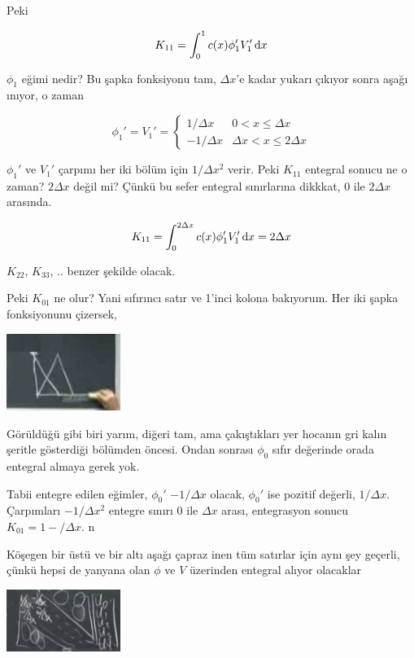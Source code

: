 \documentclass[12pt,fleqn]{article}\usepackage{../../common}
\begin{document}
Peki

$$
K_{11} = \int _{0}^{1} c(x) \phi_1' V_1' \,\mathrm{d} x
$$

$\phi_1$ eğimi nedir? Bu şapka fonksiyonu tam, $\Delta x$'e kadar yukarı
çıkıyor sonra aşağı ınıyor, o zaman

$$
\phi_1' = V_1' =
\left\{ \begin{array}{rc}
1/\Delta x & 0 < x \le \Delta x \\
-1/\Delta x & \Delta x < x \le 2\Delta x 
\end{array} \right.
$$

$\phi_1'$ ve $V_1'$ çarpımı her iki bölüm için $1/\Delta x^2$ verir. Peki
$K_{11}$ entegral sonucu ne o zaman? $2 \Delta x$ değil mi? Çünkü bu sefer
entegral sınırlarına dikkkat, 0 ile $2\Delta x$ arasında. 

$$
K_{11} = \int _{0}^{2\Delta x} c(x) \phi_1' V_1' \,\mathrm{d} x = 2\Delta x
$$

$K_{22}$, $K_{33}$, .. benzer şekilde olacak. 

Peki $K_{01}$ ne olur? Yani sıfırıncı satır ve 1'inci kolona bakıyorum. Her iki
şapka fonksiyonunu çizersek,

\includegraphics[width=10em]{compscieng_1_18_07.png}

Görüldüğü gibi biri yarım, diğeri tam, ama çakıştıkları yer hocanın gri
kalın şeritle gösterdiği bölümden öncesi. Ondan sonrası $\phi_0$ sıfır
değerinde orada entegral almaya gerek yok. 

Tabii entegre edilen eğimler, $\phi_0'$ $-1/\Delta x$ olacak, $\phi_0'$ ise
pozitif değerli, $1/\Delta x$. Çarpımları $-1/\Delta x^2$ entegre sınırı 0 ile
$\Delta x$ arası, entegrasyon sonucu $K_{01} = 1-/\Delta x$. n

Köşegen bir üstü ve bir altı aşağı çapraz inen tüm satırlar için aynı şey
geçerli, çünkü hepsi de yanyana olan $\phi$ ve $V$ üzerinden entegral alıyor
olacaklar

\includegraphics[width=10em]{compscieng_1_18_08.png}
\end{document}
